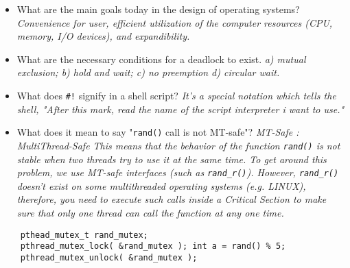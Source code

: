 \documentclass[10pt,landscape]{article}
\begin{document}
\begin{multicols}{4}
\begin{itemize}
    \item What are the main goals today in the design of operating systems? \textit{Convenience for user, efficient utilization of the computer resources (CPU, memory, I/O devices), and expandibility.}
    \item What are the necessary conditions for a deadlock to exist.  \textit{a) mutual exclusion; b) hold and wait; c) no preemption d) circular wait.}
    \item What does \verb$#!$ signify in a shell script? \textit{It's a special notation which tells the shell, "After this mark, read the name of the script interpreter i want to use."}
    \item What does it mean to say "\verb$rand()$ call is not MT-safe"? \textit{MT-Safe : MultiThread-Safe This means that the behavior of the function \texttt{rand()} is not stable when two threads try to use it at the same time. To get around this problem, we use MT-safe interfaces (such as \texttt{rand\_r()}).  However, \texttt{rand\_r()} doesn't exist on some multithreaded operating systems (e.g. LINUX), therefore, you need to execute such calls inside a Critical Section to make sure that only one thread can call the function at any one time.}
\end{itemize}

\begin{verbatim}
    pthead_mutex_t rand_mutex;
    pthread_mutex_lock( &rand_mutex ); int a = rand() % 5;
    pthread_mutex_unlock( &rand_mutex );
\end{verbatim}


\end{multicols}
\end{document}
